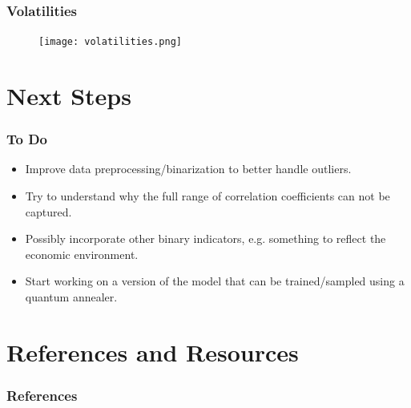 \documentclass{beamer}
\begin{document}
\begin{frame}
    \frametitle{Volatilities}
    \begin{figure}
        \texttt{[image: volatilities.png]}
        \label{volatilities}
    \end{figure}
\end{frame}


\section{Next Steps}

\begin{frame}
    \frametitle{To Do}
    \begin{itemize}
        \item Improve data preprocessing/binarization to better handle outliers.
        \item Try to understand why the full range of correlation coefficients can not be captured.
        \item Possibly incorporate other binary indicators, e.g. something to reflect the economic environment.
        \item Start working on a version of the model that can be trained/sampled using a quantum annealer.
    \end{itemize}
\end{frame}


\section{References and Resources}

\begin{frame}[allowframebreaks]
    \frametitle{References}
    \footnotesize{
        
        
    }
\end{frame}
\end{document}
